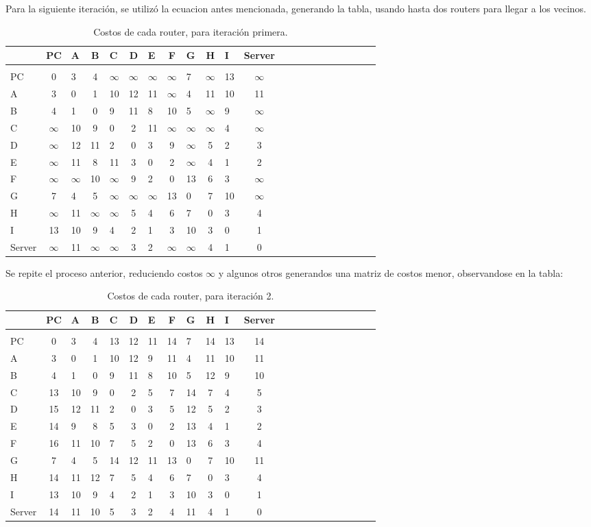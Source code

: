 \documentclass[a4papaer]{article}
\begin{document}
\pagebreak
 

Para la siguiente iteración, se utilizó la ecuacion antes mencionada, generando la tabla, usando hasta dos routers para llegar a los vecinos.

\begin{table}[h]
\centering
\begin{tabular}{lclclclclclclclclclclc}

& PC & A & B & C & D & E & F & G & H & I & Server \\\hline\\
PC&0&3&4&$\infty$&$\infty$&$\infty$&$\infty$&7&$\infty$&13&$\infty$ \\
A&3&0&1&10&12&11&$\infty$&4&11&10&11 \\
B&4&1&0&9&11&8&10&5&$\infty$&9&$\infty$ \\
C&$\infty$&10&9&0&2&11&$\infty$&$\infty$&$\infty$&4&$\infty$ \\
D&$\infty$&12&11&2&0&3&9&$\infty$&5&2&3 \\
E&$\infty$&11&8&11&3&0&2&$\infty$&4&1&2 \\
F&$\infty$&$\infty$&10&$\infty$&9&2&0&13&6&3&$\infty$ \\
G&7&4&5&$\infty$&$\infty$&$\infty$&13&0&7&10&$\infty$ \\
H&$\infty$&11&$\infty$&$\infty$&5&4&6&7&0&3&4 \\
I&13&10&9&4&2&1&3&10&3&0&1 \\
Server&$\infty$&11&$\infty$&$\infty$&3&2&$\infty$&$\infty$&4&1&0 \\

\end{tabular}
\caption{\label{tab:widgets}Costos de cada router, para iteración primera.}
\end{table}

Se repite el proceso anterior, reduciendo costos $\infty$ y algunos otros generandos una matriz de costos menor, observandose en la tabla:

\begin{table}[h]
\centering
\begin{tabular}{lclclclclclclclclclclc}

& PC & A & B & C & D & E & F & G & H & I & Server \\\hline\\
PC&0&3&4&13&12&11&14&7&14&13&14 \\
A&3&0&1&10&12&9&11&4&11&10&11 \\
B&4&1&0&9&11&8&10&5&12&9&10 \\
C&13&10&9&0&2&5&7&14&7&4&5 \\
D&15&12&11&2&0&3&5&12&5&2&3 \\
E&14&9&8&5&3&0&2&13&4&1&2 \\
F&16&11&10&7&5&2&0&13&6&3&4 \\
G&7&4&5&14&12&11&13&0&7&10&11 \\
H&14&11&12&7&5&4&6&7&0&3&4 \\
I&13&10&9&4&2&1&3&10&3&0&1 \\
Server&14&11&10&5&3&2&4&11&4&1&0 \\

\end{tabular}
\caption{\label{tab:widgets}Costos de cada router, para iteración 2.}
\end{table}
 
\end{document}
